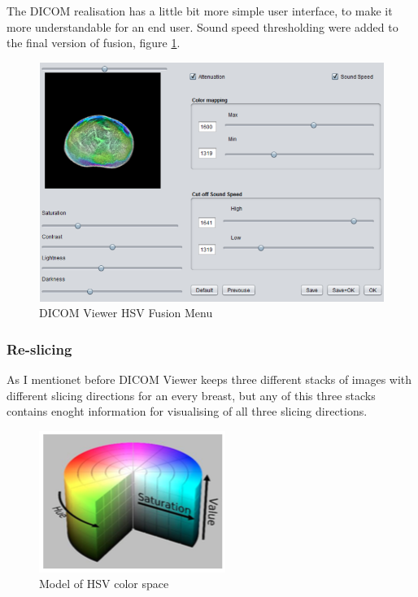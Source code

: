 \documentclass[english]{article}
\begin{document}
The DICOM realisation has a little bit more simple user interface, to make it more understandable for an end user. Sound speed thresholding were added to the final version of fusion, figure \ref{fig:final}.

\begin{figure}
\centerline{\includegraphics[scale=0.5]{internship_report/final}}
\caption{DICOM Viewer HSV Fusion Menu \label{fig:final}}
\end{figure}

\subsubsection{Re-slicing}

As I mentionet before DICOM Viewer keeps three different stacks of images with different slicing directions for an every breast, but any of this three stacks contains enoght information for visualising of all three slicing directions.\\

\begin{figure}[H]
\centerline{\includegraphics[scale=0.7]{internship_report/model}}
\caption{Model of HSV color space\label{fig:model}}
\end{figure}
\end{document}
